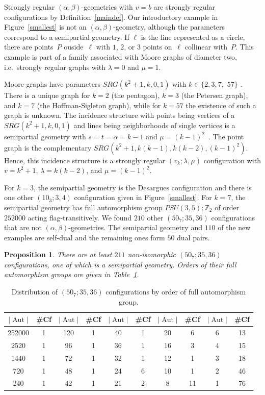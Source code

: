 \documentclass[12pt, reqno]{amsart}
\newtheorem{proposition}[theorem]{Proposition}
\def\Z{\mathbb{Z}}
\def\Aut{\mathop{\mathrm{Aut}}}
\begin{document}
Strongly regular $(\alpha,\beta)$-geometries with $v=b$ are strongly regular configurations
by Definition~\ref{maindef}. Our introductory example in Figure~\ref{smallest} is
not an $(\alpha,\beta)$-geometry, although the parameters %
correspond to a semipartial geometry. If $\ell$ is the line represented as a circle, there are points~$P$ ouside~$\ell$
with $1$, $2$, or $3$ points on~$\ell$ collinear with~$P$. This example is part of a family associated with Moore
graphs of diameter two, i.e.\ strongly regular graphs with $\lambda=0$ and $\mu=1$.

Moore graphs have parameters $SRG(k^2+1,k,0,1)$ with
$k\in \{2,3,7,$ $57\}$ \cite{HS60}. There is a unique graph for $k=2$ (the pentagon),
$k=3$ (the Petersen graph), and $k=7$ (the Hoffman-Sigleton graph), while
for $k=57$ the existence of such a graph is unknown. The incidence structure with points
being vertices of a $SRG(k^2+1,k,0,1)$ and lines being neighborhoods of single vertices
is a semipartial geo\-metry with $s=t=\alpha=k-1$ and $\mu=(k-1)^2$~\cite{DT78}. The point
graph is the complementary $SRG(k^2+1,k(k-1),k(k-2),(k-1)^2)$. Hence, this incidence
structure is a strongly regular $(v_k;\lambda,\mu)$ configuration
with $v=k^2+1$, $\lambda=k(k-2)$, and $\mu=(k-1)^2$.

For $k=3$, the semipartial geometry
is the Desargues configuration and there is one other $(10_3;3,4)$ configuration given in
Figure~\ref{smallest}. For $k=7$, the semipartial geometry has
full automorphism group $PSU(3,5) : \Z_2$ of order $252000$ acting flag-transitively.
We found $210$ other $(50_7;35,36)$ configurations that are not $(\alpha,\beta)$-geometries.
The semipartial geometry and $110$ of the new examples are self-dual and the remaining ones
form $50$ dual pairs.

\begin{proposition}\label{src50}
There are at least $211$ non-isomorphic $(50_7;35,36)$
configurations, one of which is a semipartial geometry.
Orders of their full automorphism
groups are given in Table~\ref{table50}.
\end{proposition}

\begin{table}[h]
\begin{tabular}{|c c|c c|c c|c c|c c|}
\hline
$|\Aut|$ & \#Cf & $|\Aut|$ & \#Cf & $|\Aut|$ & \#Cf & $|\Aut|$ & \#Cf & $|\Aut|$ & \#Cf \\
\hline
252000 & 1 & 120 & 1 & 40 & 1 & 20 & 6 & 6 & 13 \\
2520 & 1 & 96 & 1 & 36 & 1 & 16 & 3 & 4 & 15 \\
1440 & 1 & 72 & 1 & 32 & 1 & 12 & 1 & 3 & 18 \\
720 & 1 & 48 & 1 & 24 & 6 & 10 & 1 & 2 & 46 \\
240 & 1 & 42 & 1 & 21 & 2 & 8 & 11 & 1 & 76 \\
\hline
\end{tabular}
\vskip 3mm \caption{Distribution of $(50_7;35,36)$ configurations by
order of full automorphism group.}\label{table50}
\end{table}
\end{document}
